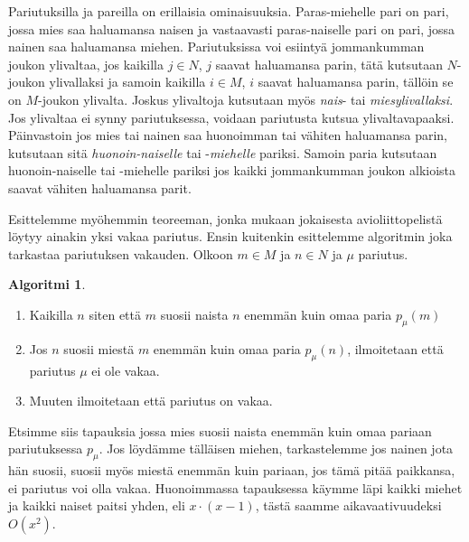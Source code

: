 \documentclass[finnish]{tktltiki2}
\theoremstyle{definition}
\newtheorem{alg}[lau]{Algoritmi}
\theoremstyle{remark}
\begin{document}
Pariutuksilla ja pareilla on erillaisia ominaisuuksia. Paras-miehelle pari on pari, jossa mies saa haluamansa naisen ja vastaavasti paras-naiselle pari on pari, jossa nainen saa haluamansa miehen. Pariutuksissa voi esiintyä jommankumman joukon ylivaltaa, jos kaikilla $j \in N$, $j$ saavat haluamansa parin, tätä kutsutaan $N$-joukon ylivallaksi ja samoin kaikilla $i \in M$, $i$ saavat haluamansa parin, tällöin se on $M$-joukon ylivalta. Joskus ylivaltoja kutsutaan myös \emph{nais}- tai \emph{miesylivallaksi}. Jos ylivaltaa ei synny pariutuksessa, voidaan pariutusta kutsua ylivaltavapaaksi.
Päinvastoin jos mies tai nainen saa huonoimman tai vähiten haluamansa parin, kutsutaan sitä \emph{huonoin-naiselle} tai -\emph{miehelle} pariksi. Samoin paria kutsutaan huonoin-naiselle tai -miehelle pariksi jos kaikki jommankumman joukon alkioista saavat vähiten haluamansa parit.

Esittelemme myöhemmin teoreeman, jonka mukaan jokaisesta avioliittopelistä löytyy ainakin yksi vakaa pariutus. Ensin kuitenkin esittelemme algoritmin joka tarkastaa pariutuksen vakauden.
Olkoon $m \in M$ ja $n \in N$ ja $\mu$ pariutus.
\begin{alg}
\begin{enumerate}
	\item Kaikilla $n$ siten että $m$ suosii naista $n$ enemmän kuin omaa paria $p_{\mu}(m)$
	\item Jos $n$ suosii miestä $m$ enemmän kuin omaa paria $p_{\mu}(n)$, ilmoitetaan että pariutus $\mu$ ei ole vakaa.
	\item Muuten ilmoitetaan että pariutus on vakaa.
\end{enumerate}
\end{alg}

Etsimme siis tapauksia jossa mies suosii naista enemmän kuin omaa pariaan pariutuksessa $p_\mu$.
Jos löydämme tälläisen miehen, tarkastelemme jos nainen jota hän suosii, suosii myös miestä enemmän kuin pariaan, jos tämä pitää paikkansa, ei pariutus voi olla vakaa.
Huonoimmassa tapauksessa käymme läpi kaikki miehet ja kaikki naiset paitsi yhden, eli $x\cdot(x-1)$, tästä saamme aikavaativuudeksi $O(x^2)$.
\end{document}
